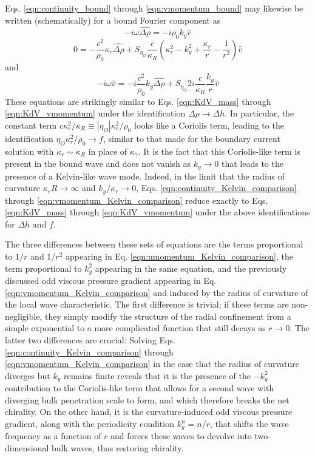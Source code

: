 \documentclass[%
 reprint,
superscriptaddress,
longbibliography,
 amsmath,amssymb,
 prl,
 citeautoscript,
]{revtex4-1}
\begin{document}
Eqs. \ref{eqn:continuity_bound} through \ref{eqn:vmomentum_bound} may likewise be written (schematically) for a bound Fourier component as
\begin{equation}
- i \omega \hat{\Delta \rho} = - i \rho_0 k_y \hat{v}
\label{eqn:continuity_Kelvin_comparison}
\end{equation}
\begin{equation}
0 = - \frac{c^2}{\rho_0} \kappa_r \hat{\Delta \rho} + S_{\eta_O} \frac{c}{\kappa_R} \left( \kappa_r^2 - k_y^2 + \frac{\kappa_r}{r} - \frac{1}{r^2} \right) \hat{v}
\label{eqn:umomentum_Kelvin_comparison}
\end{equation}
and
\begin{equation}
- i \omega \hat{v} = - i \frac{c^2}{\rho_0} k_y \hat{\Delta \rho} + S_{\eta_O} 2 i \frac{c}{\kappa_R} \frac{k_y}{r} \hat{v}
\label{eqn:vmomentum_Kelvin_comparison}
\end{equation}
These equations are strikingly similar to Eqs. \ref{eqn:KdV_mass} through \ref{eqn:KdV_vmomentum} under the identification $\Delta \rho \rightarrow \Delta h$. In particular, the constant term $c \kappa_r^2 / \kappa_R \equiv \left| \eta_O \right| \kappa_r^2 / \rho_0$ looks like a Coriolis term, leading to the identification $\eta_O \kappa_r^2 / \rho_0 \rightarrow f$, similar to that made for the boundary current solution with $\kappa_r \sim \kappa_R$ in place of $\kappa_{\gamma}$. It is the fact that this Coriolis-like term is present in the bound wave and does not vanish as $k_y \rightarrow 0$ that leads to the presence of a Kelvin-like wave mode. Indeed, in the limit that the radius of curvature $\kappa_r R \rightarrow \infty$ and $k_y/\kappa_r \rightarrow 0$, Eqs. \ref{eqn:continuity_Kelvin_comparison} through \ref{eqn:vmomentum_Kelvin_comparison} reduce exactly to Eqs. \ref{eqn:KdV_mass} through \ref{eqn:KdV_vmomentum} under the above identifications for $\Delta h$ and $f$.

The three differences between these sets of equations are the terms proportional to $1/r$ and $1/r^2$ appearing in Eq. \ref{eqn:umomentum_Kelvin_comparison}, the term proportional to $k_y^2$ appearing in the same equation, and the previously discussed odd viscous pressure gradient appearing in Eq. \ref{eqn:vmomentum_Kelvin_comparison} and induced by the radius of curvature of the local wave characteristic. The first difference is trivial; if these terms are non-negligible, they simply modify the structure of the radial confinement from a simple exponential to a more complicated function that still decays as $r \rightarrow 0$. The latter two differences are crucial: Solving Eqs. \ref{eqn:continuity_Kelvin_comparison} through \ref{eqn:vmomentum_Kelvin_comparison} in the case that the radius of curvature diverges but $k_y$ remains finite reveals that it is the presence of the $-k_y^2$ contribution to the Coriolis-like term that allows for a second wave with diverging bulk penetration scale to form, and which therefore breaks the net chirality. On the other hand, it is the curvature-induced odd viscous pressure gradient, along with the periodicity condition $k_y^n = n/r$, that shifts the wave frequency as a function of $r$ and forces these waves to devolve into two-dimensional bulk waves, thus restoring chirality.
\end{document}
